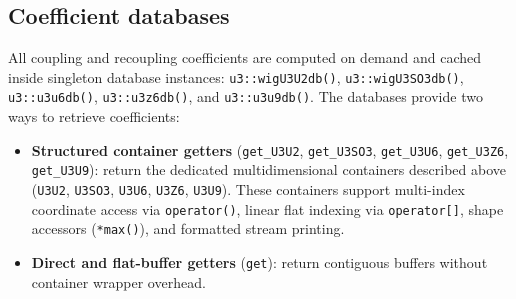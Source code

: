 \documentclass[aps,onecolumn,10pt,superscriptaddress,floatfix,nofootinbib]{revtex4}
\begin{document}
\subsection{Coefficient databases}
All coupling and recoupling coefficients are computed on demand and cached inside singleton database instances:
\verb|u3::wigU3U2db()|, \verb|u3::wigU3SO3db()|, \verb|u3::u3u6db()|, \verb|u3::u3z6db()|, and \verb|u3::u3u9db()|.
The databases provide two ways to retrieve coefficients:
\begin{itemize}
    \item \textbf{Structured container getters} (\verb|get_U3U2|, \verb|get_U3SO3|, \verb|get_U3U6|, \verb|get_U3Z6|, \verb|get_U3U9|): return the dedicated multidimensional containers described above (\verb|U3U2|, \verb|U3SO3|, \verb|U3U6|, \verb|U3Z6|, \verb|U3U9|). These containers support multi-index coordinate access via \verb|operator()|, linear flat indexing via \verb|operator[]|, shape accessors (\verb|*max()|), and formatted stream printing.
    \item \textbf{Direct and flat-buffer getters} (\verb|get|): return contiguous buffers without container wrapper overhead.%
\end{itemize}
\end{document}
